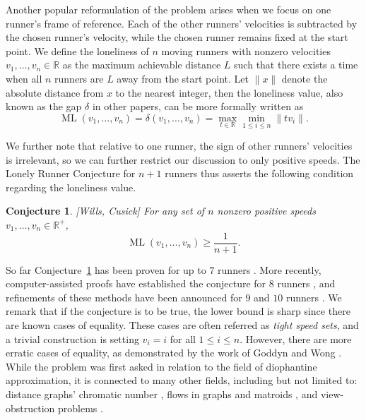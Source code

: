 \documentclass[11pt]{amsart}
\newtheorem{conj}{Conjecture}[section]
\newcommand{\norm}[1]{\lVert #1 \rVert}
\DeclareMathOperator{\ML}{ML}
\begin{document}
\par Another popular reformulation of the problem arises when we focus on one runner's frame of reference. Each of the other runners' velocities is subtracted by the chosen runner's velocity, while the chosen runner remains fixed at the start point. We define the loneliness of $n$ moving runners with nonzero velocities $v_1,\ldots,v_n \in \mathbb{R}$ as the maximum achievable distance $L$ such that there exists a time when all $n$ runners are $L$ away from the start point. Let $\norm{x}$ denote the absolute distance from $x$ to the nearest integer, then the loneliness value, also known as the gap $\delta$ in other papers, can be more formally written as
$$\ML(v_1,\ldots,v_n) = \delta(v_1,\ldots,v_n) = \max_{t \in \mathbb{R}}\min_{1 \leq i \leq n} \norm{tv_i}.$$
\par We further note that relative to one runner, the sign of other runners' velocities is irrelevant, so we can further restrict our discussion to only positive speeds. The Lonely Runner Conjecture for $n + 1$ runners thus asserts the following condition regarding the loneliness value.
\begin{conj} \label{lrc}
    [Wills, Cusick] For any set of $n$ nonzero positive speeds $v_1,\ldots,v_n \in \mathbb{R}^+$,
    $$\ML(v_1,\ldots,v_n) \geq \frac{1}{n + 1}.$$
\end{conj}
\par So far Conjecture~\ref{lrc} has been proven for up to $7$ runners \cite{barajas}. More recently, computer-assisted proofs have established the conjecture for $8$ runners \cite{rosenfeld8}, and refinements of these methods have been announced for $9$ and $10$ runners \cite{trakulthongchai910,rosenfeld9}. We remark that if the conjecture is to be true, the lower bound is sharp since there are known cases of equality. These cases are often referred as \emph{tight speed sets}, and a trivial construction is setting $v_i = i$ for all $1 \leq i \leq n$. However, there are more erratic cases of equality, as demonstrated by the work of Goddyn and Wong \cite{Goddyn2006TIGHTIO}. While the problem was first asked in relation to the field of diophantine approximation, it is connected to many other fields, including but not limited to: distance graphs' chromatic number \cite{10.11650/twjm/1500404981}, flows in graphs and matroids \cite{BIENIA19981}, and view-obstruction problems \cite{cusick}.
\end{document}
